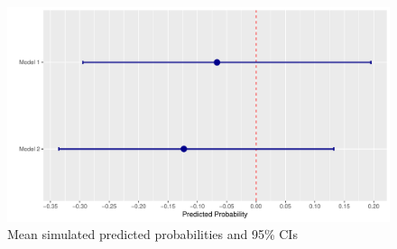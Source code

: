 \documentclass[12pt, letterpaper]{article}
\begin{document}
\begin{figure}[htbp]
	\includegraphics[scale=.7]{predplot.pdf}
	\caption{Mean simulated predicted probabilities and 95\% CIs}\label{f1}
\end{figure}


\end{document}
